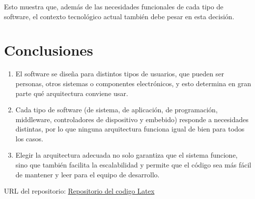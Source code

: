 \documentclass[12pt, letterpaper]{article}
\begin{document}
Esto muestra que, además de las necesidades funcionales de cada tipo de software, el contexto tecnológico actual también debe pesar en esta decisión.

\section*{Conclusiones}
\begin{enumerate}
  \item El software se diseña para distintos tipos de usuarios, que pueden ser personas, otros sistemas o componentes electrónicos, y esto determina en gran parte qué arquitectura conviene usar.
  \item Cada tipo de software (de sistema, de aplicación, de programación, middleware, controladores de dispositivo y embebido) responde a necesidades distintas, por lo que ninguna arquitectura funciona igual de bien para todos los casos.
  \item Elegir la arquitectura adecuada no solo garantiza que el sistema funcione, sino que también facilita la escalabilidad y permite que el código sea más fácil de mantener y leer para el equipo de desarrollo.

\end{enumerate}

\printbibliography[title={Bibliografía}]

\vspace{1em}
\noindent URL del repositorio: \href{https://github.com/estiven-lg/seminario-de-tecnologias-de-informacion-22026-7690-047-A}{Repositorio del codigo Latex}
\end{document}
